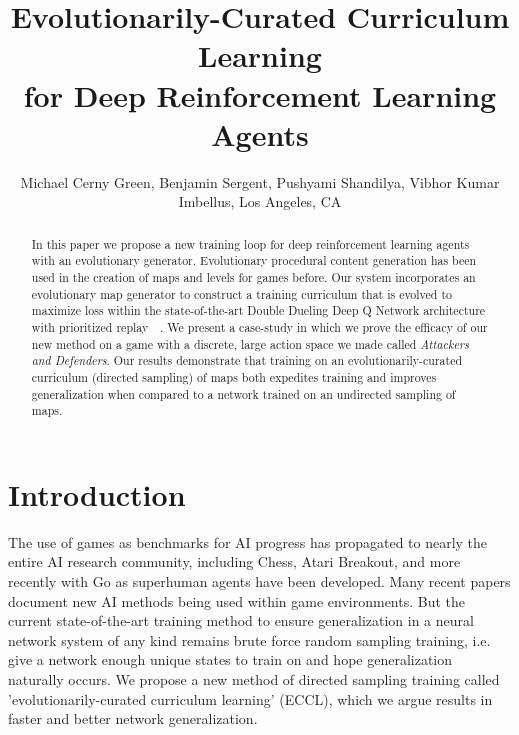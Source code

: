 \documentclass[letterpaper]{article} %
\begin{document}
\title{Evolutionarily-Curated Curriculum Learning\\ for Deep Reinforcement Learning Agents
}

\author{Michael Cerny Green, Benjamin Sergent, Pushyami Shandilya, Vibhor Kumar\\Imbellus, Los Angeles, CA}


\maketitle


\begin{abstract}

In this paper we propose a new training loop for deep reinforcement learning agents with an evolutionary generator. Evolutionary procedural content generation has been used in the creation of maps and levels for games before. Our system incorporates an evolutionary map generator to construct a training curriculum that is evolved to maximize loss within the state-of-the-art Double Dueling Deep Q Network architecture with prioritized replay~\cite{wang2016dueling}~\cite{schaul2015prioritized}. We present a case-study in which we prove the efficacy of our new method on a game with a discrete, large action space we made called \emph{Attackers and Defenders}. Our results demonstrate that training on an evolutionarily-curated curriculum (directed sampling) of maps both expedites training and improves generalization when compared to a network trained on an undirected sampling of maps.
\end{abstract}


\section{Introduction}
The use of games as benchmarks for AI progress has propagated to nearly the entire AI research community, including Chess, Atari Breakout, and more recently with Go as superhuman agents have been developed. Many recent papers document new AI methods being used within game environments. But the current state-of-the-art training method to ensure generalization in a neural network system of any kind remains brute force random sampling training, i.e. give a network enough unique states to train on and hope generalization naturally occurs. We propose a new method of directed sampling training called 'evolutionarily-curated curriculum learning' (ECCL), which we argue results in faster and better network generalization.
\end{document}
